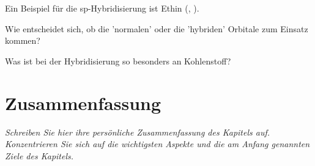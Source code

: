 Ein Beispiel für die sp-Hybridisierung ist Ethin (,  ).

\begin{questions} 
\item Wie entscheidet sich, ob die 'normalen' oder die 'hybriden' Orbitale zum Einsatz kommen?
\item Was ist bei der  Hybridisierung  so besonders an Kohlenstoff?
\end{questions}

\newpage

\section{Zusammenfassung}

\textit{Schreiben Sie hier ihre persönliche Zusammenfassung des Kapitels auf. Konzentrieren Sie sich auf die wichtigsten Aspekte und die am Anfang genannten Ziele des Kapitels.}

\vspace*{10cm}

\printbibliography[segment=\therefsegment,heading=subbibliography]
